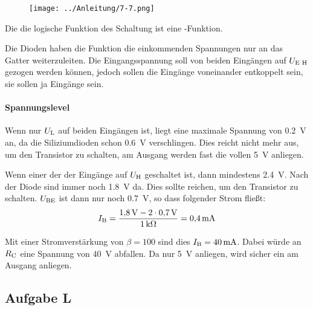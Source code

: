 \begin{figure}[htbp]
	\centering
	\texttt{[image: ../Anleitung/7-7.png]}
	\caption{%
		\cite[Abbildung~7.7]{physik313-Anleitung}
	}
	\label{fig:7-7}
\end{figure}

Die die logische Funktion des Schaltung ist eine \tnor-Funktion.

Die Dioden
haben die Funktion die einkommenden Spannungen nur an das Gatter
weiterzuleiten. Die Eingangsspannung soll von beiden Eingängen auf $\UEH$
gezogen werden können, jedoch sollen die Eingänge voneinander entkoppelt sein,
sie sollen ja Eingänge sein.

\paragraph{Spannungslevel}

Wenn nur $\UL$ auf beiden Eingängen ist, liegt eine maximale Spannung von
\SI{.2}{\volt} an, da die Siliziumdioden schon \SI{.6}{\volt} verschlingen.
Dies reicht nicht mehr aus, um den Transistor zu schalten, am Ausgang werden
fast die vollen \SI{5}{\volt} anliegen.

Wenn einer der der Eingänge auf $\UH$ geschaltet ist, dann mindestens
\SI{2.4}{\volt}. Nach der Diode sind immer noch \SI{1.8}{\volt} da. Dies sollte
reichen, um den Transistor zu schalten. $\UBE$ ist dann nur noch
\SI{.7}{\volt}, so dass folgender Strom fließt:
\[
	\IB = \frac{\SI{1.8}\volt - 2 \cdot \SI{.7}\volt}{\SI1{\kilo\ohm}}
	= \SI{.4}{\milli\ampere}
\]

Mit einer Stromverstärkung von $\beta = 100$ sind dies $\IB =
\SI{40}{\milli\ampere}$. Dabei würde an $\RC$ eine Spannung von \SI{40}{\volt}
abfallen. Da nur \SI{5}{\volt} anliegen, wird sicher ein \tlow{} am Ausgang
anliegen.

\FloatBarrier
\subsection{Aufgabe L}


